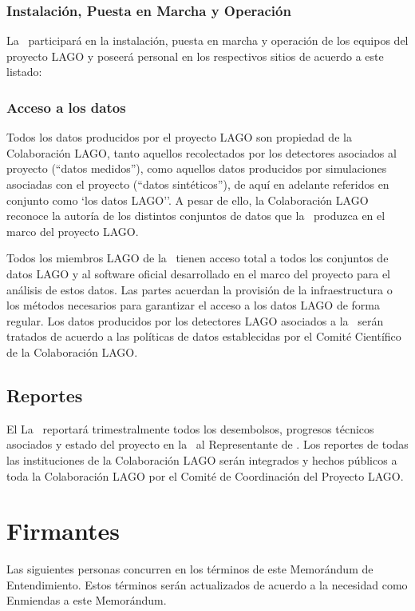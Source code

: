 \subsubsection{Instalación, Puesta en Marcha y Operación}

La \institution\ participará en la instalación, puesta en marcha y
operación de los equipos del proyecto LAGO y poseerá personal en los
respectivos sitios de acuerdo a este listado:



\subsubsection{Acceso a los datos}\label{data}

Todos los datos producidos por el proyecto LAGO son propiedad de la
Colaboración LAGO, tanto aquellos recolectados por los detectores asociados al
proyecto (``datos medidos''), como aquellos datos producidos por simulaciones
asociadas con el proyecto (``datos sintéticos''), de aquí en adelante referidos
en conjunto como `los datos LAGO''. A pesar de ello, la Colaboración LAGO
reconoce la autoría de los distintos conjuntos de datos que la
\institution~produzca en el marco del proyecto LAGO.

Todos los miembros LAGO de la \institution~tienen acceso total a todos los
conjuntos de datos LAGO y al software oficial desarrollado en el marco del
proyecto para el análisis de estos datos. Las partes acuerdan la provisión de
la infraestructura o los métodos necesarios para garantizar el acceso a los
datos LAGO de forma regular. Los datos producidos por los detectores LAGO
asociados a la \institution~serán tratados de acuerdo a las políticas de datos
establecidas por el Comité Científico de la Colaboración LAGO.

\subsection{Reportes}

\ifirg El \else La \fi \instrep~reportará trimestralmente todos los
desembolsos, progresos técnicos asociados y estado del proyecto en la
\institution~al Representante de \country. Los reportes de todas las
instituciones de la Colaboración LAGO serán integrados y hechos públicos a toda
la Colaboración LAGO por el Comité de Coordinación del Proyecto LAGO.

\section{Firmantes}

Las siguientes personas concurren en los términos de este Memorándum de
Entendimiento. Estos términos serán actualizados de acuerdo a la necesidad como
Enmiendas a este Memorándum.


